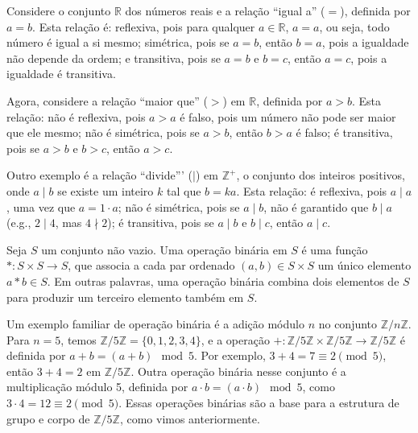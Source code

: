 \begin{example}
Considere o conjunto $\mathbb{R}$ dos números reais e a relação ``igual a'' ($=$), definida por $a = b$. Esta relação é:
reflexiva, pois para qualquer $a \in \mathbb{R}$, $a=a$, ou seja, todo número é igual a si mesmo;
simétrica, pois se $a = b$, então $b = a$, pois a igualdade não depende da ordem;
e transitiva, pois se $a = b$ e $b = c$, então $a = c$, pois a igualdade é transitiva.

Agora, considere a relação ``maior que'' ($>$) em $\mathbb{R}$, definida por $a > b$. Esta relação:
não é reflexiva, pois $a > a$ é falso, pois um número não pode ser maior que ele mesmo;
não é simétrica, pois se $a > b$, então $b > a$ é falso;
é transitiva, pois se $a > b$ e $b > c$, então $a > c$.

Outro exemplo é a relação ``divide''' ($\mid$) em $\mathbb{Z}^+$, o conjunto dos inteiros positivos,
onde $a \mid b$ se existe um inteiro $k$ tal que $b = k a$. Esta relação:
é reflexiva, pois $a \mid a$, uma vez que $a = 1 \cdot a$;
não é simétrica, pois se $a \mid b$, não é garantido que $b \mid a$ (e.g., $2 \mid 4$, mas $4 \nmid 2$);
é transitiva, pois se $a \mid b$ e $b \mid c$, então $a \mid c$.
\end{example}



\begin{definition}\label{def:operacaobinaria}
Seja $S$ um conjunto não vazio. Uma operação binária em $S$ é uma função
$*: S \times S \to S$, que associa a cada par ordenado $(a, b) \in S \times S$
um único elemento $a * b \in S$. Em outras palavras, uma operação binária
combina dois elementos de $S$ para produzir um terceiro elemento também em $S$.
\end{definition}

\begin{example}
Um exemplo familiar de operação binária é a adição módulo $n$ no conjunto
$\mathbb{Z}/n\mathbb{Z}$. Para $n = 5$, temos
$\mathbb{Z}/5\mathbb{Z} = \{0, 1, 2, 3, 4\}$, e a operação
$+: \mathbb{Z}/5\mathbb{Z} \times \mathbb{Z}/5\mathbb{Z} \to \mathbb{Z}/5\mathbb{Z}$
é definida por $a + b = (a + b) \mod 5$.
Por exemplo, $3 + 4 = 7 \equiv 2 \pmod{5}$, então $3 + 4 = 2$
em $\mathbb{Z}/5\mathbb{Z}$. Outra operação binária nesse conjunto é a
multiplicação módulo 5, definida por $a \cdot b = (a \cdot b) \mod 5$, como
$3 \cdot 4 = 12 \equiv 2 \pmod{5}$. Essas operações binárias são a base para
a estrutura de grupo e corpo de $\mathbb{Z}/5\mathbb{Z}$, como vimos
anteriormente.
\end{example}





